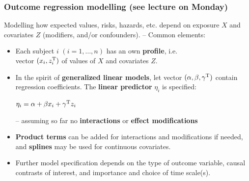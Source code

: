 \documentclass[12pt,dvipsnames,t,aspectratio=169, handout%
]{beamer}
\begin{document}
\begin{frame}
\frametitle{\large Outcome regression modelling (see lecture on Monday)}

Modelling how expected values, risks, hazards, etc. depend on %
exposure $X$ and covariates $Z$ (modifiers, and/or confounders). 
\pause 
-- Common elements:
 \begin{itemize} 
 \item
Each subject $i$ $(i=1, \dots, n)$ has an own {\bf profile}, i.e. \\
vector $(x_{i}, z_i^{\small\text{T}})$ of values of $X$ and covariates $Z$.   
\pause
\medskip
\item
 In the spirit of \textbf{generalized linear models}, let vector  
  $(\alpha, \beta, \gamma^{\small\text{T}})$ contain regression coefficients.
  The \textbf{linear predictor} $\eta_i$ is specified: \\
	\begin{center}
 $ \eta_i = \alpha + \beta x_i + \gamma^{\small\text{T}}z_i $
\end{center}
-- assuming so far no {\bf interactions} or {\bf effect modifications} 
\pause
\medskip
\item
{\bf Product terms} can be added for interactions and modifications if needed, 
and {\bf splines} may be used for continuous covariates.
\medskip
\item
Further model specification depends on the type of outcome variable, 
causal contrasts of interest, and importance and choice of time scale(s).  
\end{itemize} 
\end{frame}
\end{document}
